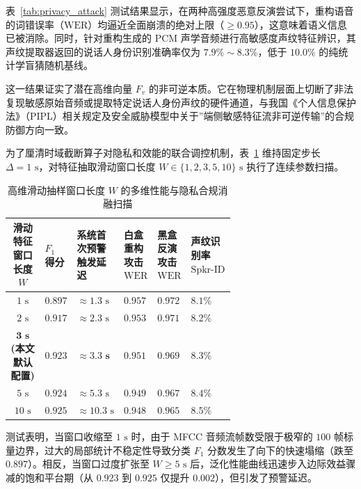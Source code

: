 \documentclass[11pt, a4paper]{article}
\begin{document}
表~\ref{tab:privacy_attack} 测试结果显示，在两种高强度恶意反演尝试下，重构语音的词错误率（$\mathrm{WER}$）均逼近全面崩溃的绝对上限（$\ge 0.95$），这意味着语义信息已被消除。同时，针对重构生成的 PCM 声学音频进行高敏感度声纹特征辨识，其声纹提取器返回的说话人身份识别准确率仅为 $7.9\% \sim 8.3\%$，低于 $10.0\%$ 的纯统计学盲猜随机基线。

这一结果证实了潜在高维向量 $F_v$ 的非可逆本质。它在物理机制层面上切断了非法复现敏感原始音频或提取特定说话人身份声纹的硬件通道，与我国《个人信息保护法》（PIPL）相关规定及安全威胁模型中关于”端侧敏感特征流非可逆传输”的合规防御方向一致。

为了厘清时域截断算子对隐私和效能的联合调控机制，表~\ref{tab:window_ablation} 维持固定步长 $\Delta = 1\text{ s}$，对特征抽取滑动窗口长度 $W \in \{1, 2, 3, 5, 10\}\text{ s}$ 执行了连续参数扫描。

\begin{table}[htbp]
\centering
\caption{高维滑动抽样窗口长度 $W$ 的多维性能与隐私合规消融扫描}
\label{tab:window_ablation}
\small
\renewcommand{\arraystretch}{1.15}
\begin{tabular}{c>{\centering\arraybackslash}p{0.12\linewidth}>{\centering\arraybackslash}p{0.12\linewidth}>{\centering\arraybackslash}p{0.14\linewidth}>{\centering\arraybackslash}p{0.14\linewidth}>{\centering\arraybackslash}p{0.12\linewidth}}
\toprule
\textbf{滑动特征窗口长度 $W$} & \textbf{$F_1$ 得分} & \textbf{系统首次预警触发延迟} & \textbf{白盒重构攻击 $\mathrm{WER}$} & \textbf{黑盒反演攻击 $\mathrm{WER}$} & \textbf{声纹识别率 $\mathrm{Spkr\text{-}ID}$} \\
\midrule
$1\text{ s}$ & $0.897$ & $\approx 1.3\text{ s}$ & $0.957$ & $0.972$ & $8.1\%$ \\
$2\text{ s}$ & $0.917$ & $\approx 2.3\text{ s}$ & $0.953$ & $0.971$ & $8.2\%$ \\
$\mathbf{3\text{ s}}$ \textbf{(本文默认配置)} & $\mathbf{0.923}$ & $\mathbf{\approx 3.3\text{ s}}$ & $\mathbf{0.951}$ & $\mathbf{0.969}$ & $\mathbf{8.3\%}$ \\
$5\text{ s}$ & $0.924$ & $\approx 5.3\text{ s}$ & $0.949$ & $0.967$ & $8.4\%$ \\
$10\text{ s}$ & $0.925$ & $\approx 10.3\text{ s}$ & $0.948$ & $0.965$ & $8.5\%$ \\
\bottomrule
\end{tabular}
\end{table}

测试表明，当窗口收缩至 $1\text{ s}$ 时，由于 MFCC 音频流帧数受限于极窄的 $100$ 帧标量边界，过大的局部统计不稳定性导致分类 $F_1$ 分数发生了向下的快速塌缩（跌至 $0.897$）。相反，当窗口过度扩张至 $W \ge 5\text{ s}$ 后，泛化性能曲线迅速步入边际效益骤减的饱和平台期（从 $0.923$ 到 $0.925$ 仅提升 $0.002$），但引发了预警延迟。
\end{document}
